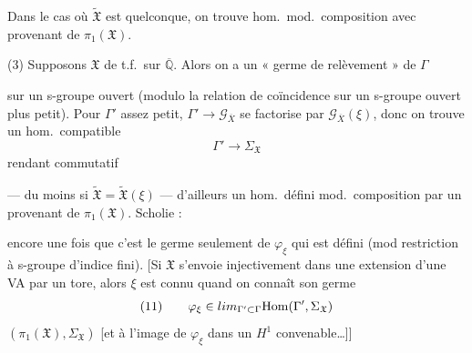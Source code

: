 \documentclass[11pt,a4paper]{article}
\begin{document}
Dans le cas où $\widetilde{\mathfrak{X}}$ est quelconque, on trouve 
hom.\ mod.\ composition avec  provenant de
$\pi_1(\mathfrak{X})$. 


(3) Supposons $\mathfrak{X}$ de t.f.\ sur $\overline{\mathbb{Q}}$.
Alors on a un « germe de relèvement » de $\Gamma$


sur un s-groupe ouvert (modulo la relation de coïncidence sur un s-groupe
ouvert plus petit). Pour  $\Gamma'$ assez petit,
 $\Gamma' \to \mathcal{G}_{\overline{X}}$
se factorise par $\mathcal{G}_{\overline{X}}(\xi)$, donc on trouve un
 hom.\ compatible
\[
  \Gamma' \longrightarrow \Sigma_{\mathfrak{X}}
\]
rendant commutatif


--- du moins si $\widetilde{\mathfrak{X}} = \widetilde{\mathfrak{X}}(\xi)$ ---
d'ailleurs un hom.\ défini mod.\ composition par un  provenant de $\pi_1(\mathfrak{X})$. Scholie : \ill{}

encore une fois que c'est le germe seulement de $\varphi_{\xi}$ qui est défini
(mod restriction à s-groupe d'indice fini). [Si $\mathfrak{X}$ s'envoie
injectivement dans une extension d'une VA par un tore, alors $\xi$ est connu
quand on connaît son germe
\[
  (11)\qquad \varphi_{\xi} \in \varinjlim_{\Gamma' \subset \Gamma}
  \mathrm{Hom}(\Gamma', \Sigma_{\mathfrak{X}})
\]
\ill{} $(\pi_1(\mathfrak{X}), \Sigma_{\mathfrak{X}})$
[et à l'image de $\varphi_{\xi}$ dans un $H^1$ convenable…]]
\end{document}
